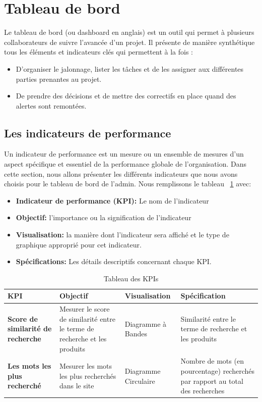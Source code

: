 \section{Tableau de bord}
\noindent
Le tableau de bord (ou dashboard en anglais) est un outil qui permet à plusieurs collaborateurs de suivre l’avancée d’un projet. Il présente de manière synthétique tous les éléments et indicateurs clés qui permettent à la fois :
\begin{itemize}
	\item D’organiser le jalonnage, lister les tâches et de les assigner aux différentes parties prenantes au projet.
	\item De prendre des décisions et de mettre des correctifs en place quand des alertes sont remontées.
\end{itemize}


\subsection{Les indicateurs de performance}
\noindent
Un indicateur de performance est un mesure ou un ensemble de mesures d'un aspect spécifique et essentiel de la performance globale de l'organisation.
Dans cette section, nous allons présenter les différents indicateurs que nous avons choisis pour le tableau de bord de l'admin. Nous remplissons le tableau ~\ref{tab:kpi} avec:
\begin{itemize}
	\item \large\textbf{Indicateur de performance (KPI):} Le nom de l'indicateur
	\item \large\textbf{Objectif:} l'importance ou la signification de l'indicateur
	\item \large\textbf{Visualisation:} la manière dont l'indicateur sera affiché et le type de graphique approprié pour cet indicateur.
	\item \large\textbf{Spécifications:} Les détails descriptifs concernant chaque KPI.
\end{itemize}

\newpage
\begin{table}[H]
    \centering
    \renewcommand{\arraystretch}{1.5}
    \begin{tabular}{|>{\bfseries}m{4cm}|m{4cm}|m{4cm}|m{4cm}|}
        \hline
        \rowcolor{blue!50}
        \textbf{KPI} & \textbf{Objectif} & \textbf{Visualisation} & \textbf{Spécification} \\
        \hline
        Score de similarité de recherche & Mesurer le score de similarité entre le terme de recherche et les produits & Diagramme à Bandes & Similarité entre le terme de recherche et les produits  \\
        \hline
        Les mots les plus recherché & Mesurer les mots les plus recherchés dans le site  & Diagramme Circulaire & Nombre de mots (en pourcentage) recherchés par rapport au total des recherches \\
        \hline
    \end{tabular}
    \caption{Tableau des KPIs}
    \label{tab:kpi}
\end{table}

